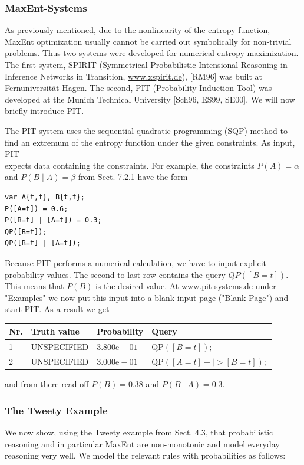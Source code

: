 \documentclass[10pt]{article}
\begin{document}
\subsubsection*{MaxEnt-Systems}
As previously mentioned, due to the nonlinearity of the entropy function, MaxEnt optimization usually cannot be carried out symbolically for non-trivial problems. Thus two systems were developed for numerical entropy maximization. The first system, SPIRIT (Symmetrical Probabilistic Intensional Reasoning in Inference Networks in Transition, \href{http://www.xspirit.de}{www.xspirit.de}), [RM96] was built at Fernuniversität Hagen. The second, PIT (Probability Induction Tool) was developed at the Munich Technical University [Sch96, ES99, SE00]. We will now briefly introduce PIT.

The PIT system uses the sequential quadratic programming (SQP) method to find an extremum of the entropy function under the given constraints. As input, PIT\\
expects data containing the constraints. For example, the constraints $P(A)=\alpha$ and $P(B \mid A)=\beta$ from Sect. 7.2.1 have the form

\begin{verbatim}
var A{t,f}, B{t,f};
P([A=t]) = 0.6;
P([B=t] | [A=t]) = 0.3;
QP([B=t]);
QP([B=t] | [A=t]);
\end{verbatim}

Because PIT performs a numerical calculation, we have to input explicit probability values. The second to last row contains the query $Q P([B=t])$. This means that $P(B)$ is the desired value. At \href{http://www.pit-systems.de}{www.pit-systems.de} under "Examples" we now put this input into a blank input page ("Blank Page") and start PIT. As a result we get

\begin{center}
\begin{tabular}{llll}
\hline
Nr. & Truth value & Probability & Query \\
\hline
1 & UNSPECIFIED & $3.800 \mathrm{e}-01$ & $\mathrm{QP}([B=t]) ;$ \\
\hline
2 & UNSPECIFIED & $3.000 \mathrm{e}-01$ & $\mathrm{QP}([A=t]-\mid>[B=t]) ;$ \\
\hline
\end{tabular}
\end{center}

and from there read off $P(B)=0.38$ and $P(B \mid A)=0.3$.

\subsubsection*{The Tweety Example}
We now show, using the Tweety example from Sect. 4.3, that probabilistic reasoning and in particular MaxEnt are non-monotonic and model everyday reasoning very well. We model the relevant rules with probabilities as follows:
\end{document}
